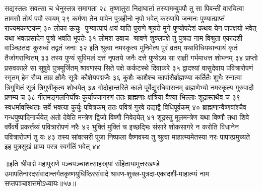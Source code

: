 सद्यस्ततः सवत्सा च धेनुस्तत्र समागता २८
तृष्णातुरा निदाघार्ता तस्यामम्बुपपौ तु सा 
पिबन्तीं वारयित्वा तामसौ तोयं पपौ स्वयम् २९
कर्मणा तेन पापेन पुत्रहीनो नृपो भवेत् 
कस्यापि जन्मनः पुण्यात्प्राप्तं राज्यमकण्टकम् ३०
लोका ऊचुः-
पुण्यात्पापं क्षयं याति पुराणे श्रूयते मुने 
पुण्योपदेशं कथय येन पापक्षयो भवेत् 
यथा भवत्प्रसादेन पुत्रो भवति भूपतेः ३१
लोमश उवाच-
श्रावणे शुक्लपक्षे तु पुत्रदा नाम विश्रुता 
एकादशी वाञ्च्छितदा कुरुध्वं तद्व्रतं जनाः ३२
इति श्रुत्वा नमस्कृत्य मुनिमेत्य पुरं व्रतम् 
यथाविधियथान्यायं कृतं तैर्जागरान्वितम् ३३
तस्य पुण्यं सुविमलं दत्तं नृपतये जनैः 
दत्ते पुण्येऽथ सा राज्ञी गर्भमाधत्त शोभनम् ३४
प्राप्तो प्रसवकाले सा सुषुवे पुत्रमूर्जितम् 
श्रावणस्य सिते पक्षे कर्कटस्थे दिवाकरे ३५
द्वादश्यां वासुदेवाय पवित्रारोपणं स्मृतम् 
हेम रौप्य ताम्र क्षौमैः सूत्रैः कौशेयपद्मजैः ३६
कुशैः काशैश्च कार्पासैर्ब्राह्मण्या कर्तितैः शुभैः 
स्नात्वा त्रिगुणितं सूत्रं त्रिगुणीकृत्य शोधयेत् ३७
गोदोहान्तरिते काले पूर्वेद्युरधिवासनम् 
ब्राह्मणेभ्यो नमस्कृत्य गुरुपादौ प्रणम्य च ३८
गीतमङ्गलनिर्घोषः कुर्याज्जागरणं ततः 
ब्राह्मणाः क्षत्रिया वैश्या भिल्लाः शूद्रास्तथैव च ३९
स्वधर्मावस्थिताः सर्वे भक्त्या कुर्युः पवित्रकम् 
ततः पवित्रं गुरवे दद्याद्वै विधिपूर्वकम् ४०
ब्राह्मणान्वैष्णवांश्चैव गन्धपुष्पादिनार्चयेत् 
अतो देवेति मन्त्रेण द्विजो विष्णौ निवेदयेत् ४१
शूद्रस्तु मूलमन्त्रेण यथा विष्णौ तथा शिवे 
वर्षेवर्षे प्रकर्त्तव्यं पवित्रारोपणं नरैः ४२
भुक्तिं मुक्तिं च इच्छद्भिः संसारे शोकसागरे 
न करोति विधानेन पवित्रारोपणं तु यः ४३
तस्य सांवत्सरी पूजा निष्फला वैष्णवस्य तु 
श्रुत्वा माहात्म्यमेतस्या नरः पापात्प्रमुच्यते 
इह पुत्रसुखं प्राप्य परत्र स्वर्गतिं भवेत् ४४

॥इति श्रीपाद्मे महापुराणे पञ्चपञ्चाशत्साहस्र्यां संहितायामुत्तरखण्डे उमापतिनारदसंवादान्तर्गतकृष्णयुधिष्ठिरसंवादे श्रावण-शुक्ल-पुत्रदा-एकादशी-माहात्म्यं नाम सप्तपञ्चाशत्तमोऽध्यायः॥५७॥



